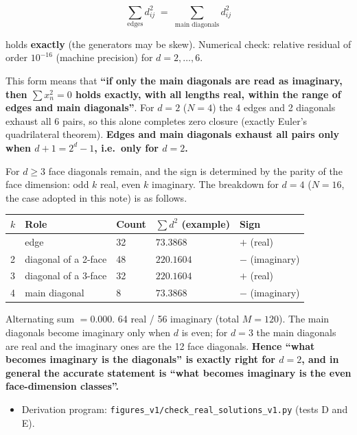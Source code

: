 \documentclass[
  10pt,
]{article}
\newcounter{none} %
\providecommand{\tightlist}{%
  \setlength{\itemsep}{0pt}\setlength{\parskip}{0pt}}
\begin{document}
\[\sum_{\text{edges}} d_{ij}^2 \;=\; \sum_{\text{main diagonals}} d_{ij}^2\]

holds \textbf{exactly} (the generators may be skew). Numerical check:
relative residual of order \(10^{-16}\) (machine precision) for
\(d=2,\dots,6\).

This form means that \textbf{``if only the main diagonals are read as
imaginary, then \(\sum x_n^2 = 0\) holds exactly, with all lengths real,
within the range of edges and main diagonals''}. For \(d=2\) (\(N=4\))
the 4 edges and 2 diagonals exhaust all 6 pairs, so this alone completes
zero closure (exactly Euler's quadrilateral theorem). \textbf{Edges and
main diagonals exhaust all pairs only when \(d+1 = 2^d-1\), i.e.~only
for \(d=2\).}

For \(d \ge 3\) face diagonals remain, and the sign is determined by the
parity of the face dimension: odd \(k\) real, even \(k\) imaginary. The
breakdown for \(d=4\) (\(N=16\), the case adopted in this note) is as
follows.

{\def\LTcaptype{none} %
\begin{longtable}[]{@{}lllll@{}}
\toprule\noalign{}
\(k\) & Role & Count & \(\sum d^2\) (example) & Sign \\
\midrule\noalign{}
\endhead
\bottomrule\noalign{}
\endlastfoot
1 & edge & 32 & \(73.3868\) & \(+\) (real) \\
2 & diagonal of a 2-face & 48 & \(220.1604\) & \(-\) (imaginary) \\
3 & diagonal of a 3-face & 32 & \(220.1604\) & \(+\) (real) \\
4 & main diagonal & 8 & \(73.3868\) & \(-\) (imaginary) \\
\end{longtable}
}

Alternating sum \(= 0.000\). 64 real / 56 imaginary (total \(M = 120\)).
The main diagonals become imaginary only when \(d\) is even; for \(d=3\)
the main diagonals are real and the imaginary ones are the 12 face
diagonals. \textbf{Hence ``what becomes imaginary is the diagonals'' is
exactly right for \(d=2\), and in general the accurate statement is
``what becomes imaginary is the even face-dimension classes''.}

\begin{itemize}
\tightlist
\item
  Derivation program: \texttt{figures\_v1/check\_real\_solutions\_v1.py}
  (tests D and E).
\end{itemize}
\end{document}
